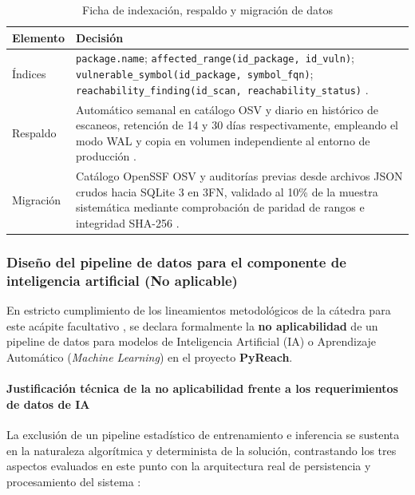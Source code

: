 \begin{table}[H]
\centering
\caption{Ficha de indexación, respaldo y migración de datos}
\label{p6:tab:ficha_operacion_datos}
\small
{}
\setlength{\tabcolsep}{6pt}
\begin{tabularx}{\textwidth}{>{\raggedright\arraybackslash}p{3.2cm} >{\raggedright\arraybackslash}X}
\toprule
\textbf{Elemento} & \textbf{Decisión} \\
\midrule
Índices & 
\texttt{package.\allowbreak name}; \texttt{affected\_\allowbreak range(id\_\allowbreak package, id\_\allowbreak vuln)}; \texttt{vulnerable\_\allowbreak symbol(id\_\allowbreak package, symbol\_\allowbreak fqn)}; \texttt{reachability\_\allowbreak finding(id\_\allowbreak scan, reachability\_\allowbreak status)} \cite{torres2026proyecto, openssf2023osv}. \\
\addlinespace
Respaldo & 
Automático semanal en catálogo OSV y diario en histórico de escaneos, retención de 14 y 30 días respectivamente, empleando el modo WAL y copia en volumen independiente al entorno de producción \cite{torres2026proyecto, gutierrez2024auditoria}. \\
\addlinespace
Migración & 
Catálogo OpenSSF OSV y auditorías previas desde archivos JSON crudos hacia SQLite 3 en 3FN, validado al 10\% de la muestra sistemática mediante comprobación de paridad de rangos e integridad SHA-256 \cite{torres2026proyecto, openssf2023osv}. \\
\bottomrule
\end{tabularx}
\end{table}

\subsubsection{Diseño del pipeline de datos para el componente de inteligencia artificial (No aplicable)}

En estricto cumplimiento de los lineamientos metodológicos de la cátedra para este acápite facultativo \cite{torres2026proyecto}, se declara formalmente la \textbf{no aplicabilidad} de un pipeline de datos para modelos de Inteligencia Artificial (IA) o Aprendizaje Automático (\textit{Machine Learning}) en el proyecto \textbf{PyReach}.

\paragraph*{Justificación técnica de la no aplicabilidad frente a los requerimientos de datos de IA}
La exclusión de un pipeline estadístico de entrenamiento e inferencia se sustenta en la naturaleza algorítmica y determinista de la solución, contrastando los tres aspectos evaluados en este punto con la arquitectura real de persistencia y procesamiento del sistema \cite{torres2026proyecto}:

